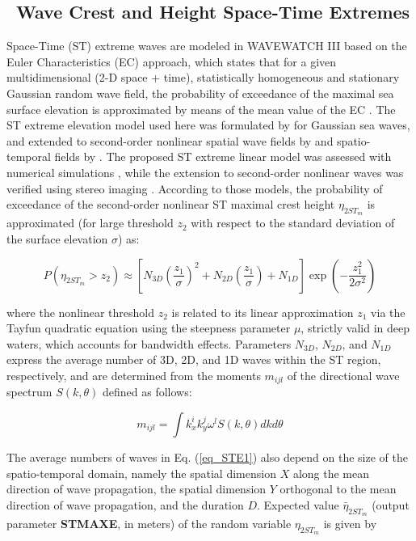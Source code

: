 \vssub
\subsection{~Wave Crest and Height Space-Time Extremes} \label{sub:space_time_ext}

Space-Time (ST) extreme waves are modeled in WAVEWATCH III based on the Euler Characteristics (EC) approach, which states that for a given multidimensional (2-D space + time), statistically homogeneous and stationary Gaussian random wave field, the probability of exceedance of the maximal sea surface elevation is approximated by means of the mean value of the EC \citep{Fed12eu}. The ST extreme elevation model used here was formulated by \cite{Fed12sp} for Gaussian sea waves, and extended to second-order nonlinear spatial wave fields by \cite{Fed13} and spatio-temporal fields by \cite{Beet15}. The proposed ST extreme linear model was assessed with numerical simulations \citep{Baet15}, while the extension to second-order nonlinear waves was verified using stereo imaging \citep{Fed13,Beet15}. According to those models, the probability of exceedance of the second-order nonlinear ST maximal crest height $\eta_{2ST_m}$ is approximated (for large threshold $z_2$ with respect to the standard deviation of the surface elevation $\sigma$) as:

\begin{equation}
P(\eta_{2ST_m} > z_2) \approx \left[N_{3D} \left( \frac{z_1}{\sigma} \right)^{2} + N_{2D} \left( \frac{z_1}{\sigma} \right) + N_{1D} \right] \exp{ \left( -\frac{z_1^2}{2 \sigma^2} \right)}
\label{eq_STE1}
\end{equation}

where the nonlinear threshold $z_2$ is related to its linear approximation $z_1$ via the Tayfun quadratic equation using the steepness parameter $\mu$, strictly valid in deep waters, which accounts for bandwidth effects. Parameters $N_{3D}$, $N_{2D}$, and $N_{1D}$ express the average number of 3D, 2D, and 1D waves within the ST region, respectively, and are determined from the moments $m_{ijl}$ of the directional wave spectrum $S(k, \theta)$ defined as follows:

\begin{equation}
m_{ijl}=\int k_{x}^{i}k_{y}^{j}\omega^{l}S(k,\theta)dkd\theta
\label{eq_STE2}
\end{equation}

The average numbers of waves in Eq. (\ref{eq_STE1}) also depend on the size of the spatio-temporal domain, namely the spatial dimension $X$ along the mean direction of wave propagation, the spatial dimension $Y$ orthogonal to the mean direction of wave propagation, and the duration $D$. Expected value $\bar{\eta}_{2ST_m}$ (output parameter \textbf{STMAXE}, in meters) of the random variable $\eta_{2ST_m}$ is given by

